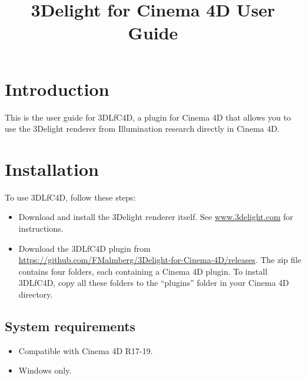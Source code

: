 \documentclass{book}
\begin{document}
\title{3Delight for Cinema 4D User Guide}
\maketitle
\newpage
\tableofcontents
\newpage

\chapter{Introduction}
This is the user guide for 3DLfC4D, a plugin for Cinema 4D that allows you to use the 3Delight renderer from Illumination research directly in Cinema 4D. 



\chapter{Installation}
To use 3DLfC4D, follow these steps: 
\begin{itemize} 
\item Download and install the 3Delight renderer itself. See \url{www.3delight.com} for instructions.
\item Download the 3DLfC4D plugin from \url{https://github.com/FMalmberg/3Delight-for-Cinema-4D/releases}. The zip file contains four folders, each containing a Cinema 4D plugin. To install 3DLfC4D, copy all these folders to the ``plugins'' folder in your Cinema 4D directory. 
\end{itemize}

\section{System requirements}
\begin{itemize}
\item Compatible with Cinema 4D R17-19.
\item Windows only. 
\end{itemize}

\end{document}
